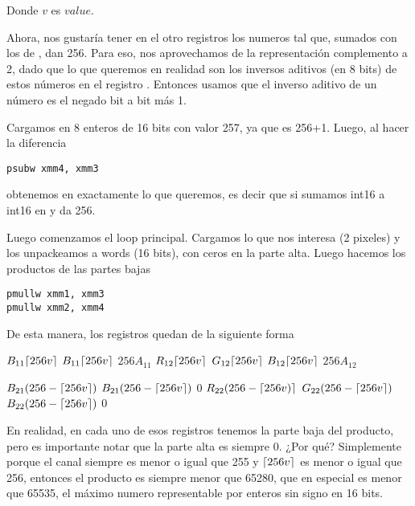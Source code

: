 

Donde $v$ es $value$.


Ahora, nos gustaría tener en el otro registros los numeros tal que, sumados con los de , dan 256. Para eso, nos aprovechamos de la representación complemento a 2, dado que lo que queremos en realidad son los inversos aditivos (en 8 bits) de estos números en el registro . Entonces usamos que el inverso aditivo de un número es el negado bit a bit más 1.

Cargamos en  8 enteros de 16 bits con valor 257, ya que es 256+1.
Luego, al hacer la diferencia

\begin{lstlisting}
psubw xmm4, xmm3
\end{lstlisting}

obtenemos en  exactamente lo que queremos, es decir que si sumamos int16 a int16 en  y  da 256.


Luego comenzamos el loop principal. Cargamos lo que nos interesa (2 pixeles) y los unpackeamos a words (16 bits), con ceros en la parte alta. Luego hacemos los productos de las partes bajas

\begin{lstlisting}
pmullw xmm1, xmm3
pmullw xmm2, xmm4 
\end{lstlisting}

De esta manera, los registros quedan de la siguiente forma

 {$B_{11}\lceil256v\rceil$} {$B_{11}\lceil256v\rceil$} {$256A_{11}$} {$R_{12}\lceil256v\rceil$} {$G_{12}\lceil256v\rceil$} {$B_{12}\lceil256v\rceil$} {$256A_{12}$}


\scriptsize{
 {$B_{21}(256-\lceil256v\rceil)$} {$B_{21}(256-\lceil256v\rceil)$} {$0$} {$R_{22}(256-\lceil256v)\rceil$} {$G_{22}(256-\lceil256v\rceil)$} {$B_{22}(256-\lceil256v\rceil)$} {$0$}
}

En realidad, en cada uno de esos registros tenemos la parte baja del producto, pero es importante notar que la parte alta es siempre 0. ¿Por qué? Simplemente porque el canal siempre es menor o igual que 255 y $\lceil256v\rceil$ es menor o igual que 256, entonces el producto es siempre menor que 65280, que en especial es menor que 65535, el máximo numero representable por enteros sin signo en 16 bits.





